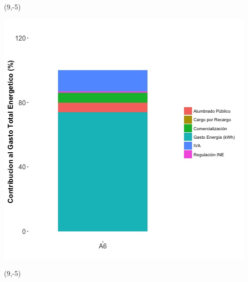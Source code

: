 \documentclass{article}\usepackage[]{graphicx}\usepackage[]{color}
\newenvironment{knitrout}{}{} %
\begin{document}
\begin{textblock}{1}(9,-5)
\begin{minipage}{20em}
\begingroup

\endgroup
\end{minipage}
\end{textblock}

\begin{knitrout}
\color{fgcolor}
\includegraphics[scale=0.65]{figure/A6_costvars_plot.jpg} 
\end{knitrout}

\begin{textblock}{1}(9,-5)
\begin{minipage}{20em}
\begingroup

\endgroup
\end{minipage}
\end{textblock}
\end{document}
